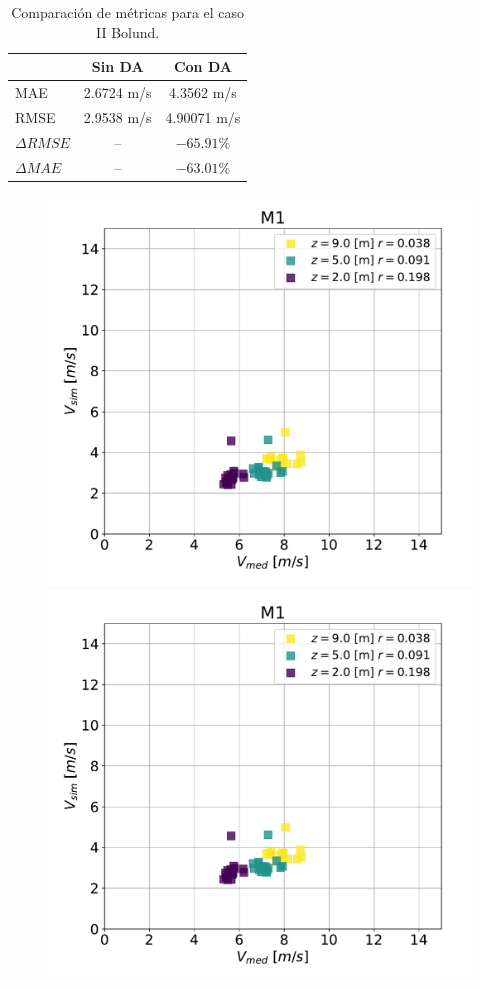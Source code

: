 \begin{table}[h!]
	\caption{Comparación de métricas para el caso II Bolund.}
	\label{tab:06_bol_mae_rmse}
	\centering%
	\begin{tabular}{lcc}
		\toprule
		& Sin DA & Con DA \\
		\midrule
		MAE & 2.6724 m/s & 4.3562 m/s \\
		RMSE & 2.9538 m/s& 4.90071 m/s\\
		$\Delta{RMSE}$&  -- & $-65.91\%$ \\
		$\Delta{MAE}$ &  -- & $-63.01\%$ \\
		\bottomrule
	\end{tabular}
\end{table}
\newpage
\vspace*{\fill}
\begin{figure}[H]
	\centering
	\includegraphics[width=0.5\linewidth,page=1,trim={0cm 0cm 0cm 0cm},clip]{Imagenes/06/bol_da/corr}%
	\includegraphics[width=0.5\linewidth,page=2,trim={0cm 0cm 0cm 0cm},clip]{Imagenes/06/bol_da/corr}%
	

\end{figure}
